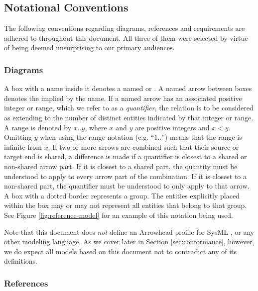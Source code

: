 \subsection{Notational Conventions}
\label{sec:introduction:conventions}

The following conventions regarding diagrams, references and requirements are adhered to throughout this document.
All three of them were selected by virtue of being deemed unsurprising to our primary audiences.

\subsubsection{Diagrams}

A box with a name inside it denotes a named  or .
A named arrow between boxes denotes the  implied by the name.
If a named arrow has an associated positive integer or range, which we refer to as a \textit{quantifier}, the relation is to be considered as extending to the number of distinct entities indicated by that integer or range.
A range is denoted by $x..y$, where $x$ and $y$ are positive integers and $x<y$.
Omitting $y$ when using the range notation (e.g. ``$1..$'') means that the range is infinite from $x$.
If two or more arrows are combined such that their source or target end is shared, a difference is made if a quantifier is closest to a shared or non-shared arrow part.
If it is closest to a shared part, the quantity must be understood to apply to every arrow part of the combination.
If it is closest to a non-shared part, the quantifier must be understood to only apply to that arrow.
A box with a dotted border represents a group.
The entities explicitly placed within the box may or may not represent all entities that belong to that group.
See Figure \ref{fig:reference-model} for an example of this notation being used.

Note that this document does \textit{not} define an Arrowhead profile for SysML \cite{omg2019sysml}, or any other modeling language.
As we cover later in Section \ref{sec:conformance}, however, we do expect all models based on this document not to contradict any of its definitions.

\subsubsection{References}

